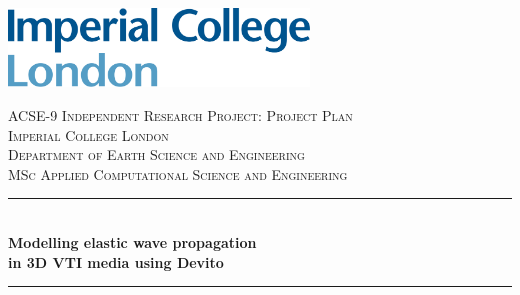 \begin{titlepage}

\newcommand{\HRule}{\rule{\linewidth}{0.5mm}} %


\includegraphics[width=8cm]{title/logo.png}\\[1cm] %
 
\center %


\textsc{\Large ACSE-9 Independent Research Project: Project Plan}\\[1.25cm] %
\textsc{\large Imperial College London}\\[0.5cm] %
\textsc{\large Department of Earth Science and Engineering}\\[0.5cm] %
\textsc{\large MSc Applied Computational Science and Engineering}\\[0.5cm] %


\makeatletter
\HRule \\[0.3cm]
     { \huge \bfseries Modelling elastic wave propagation\\[0.2cm] in 3D VTI media using Devito}\\[0.3cm] %
\HRule \\[1.0cm]
 


\end{titlepage}
